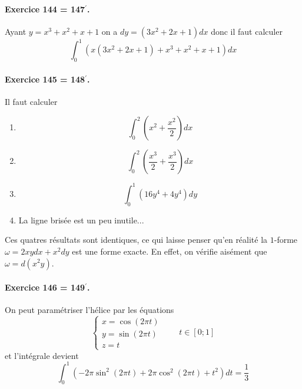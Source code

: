 \paragraph{Exercice 144 = 147$^\prime$.}
Ayant $y = x^3 + x^2 + x + 1$ on a $d y = (3 x^2 + 2 x + 1)d x$ donc
il faut calculer
\begin{equation*}
\int_0^1 (x (3 x^2 + 2 x + 1) + x^3 + x^2 + x + 1)d x
\end{equation*}

\paragraph{Exercice 145 = 148$^\prime$.}
Il faut calculer
\begin{enumerate}
\item
\begin{equation*}
\int_0^2 (x^2 + \frac{x^2}{2}) d x
\end{equation*}
\item
\begin{equation*}
\int_0^2 (\frac{x^3}{2} + \frac{x^3}{2}) d x
\end{equation*}
\item 
\begin{equation*}
\int_0^1  (16 y^4 + 4 y^4)d y
\end{equation*}
\item La ligne brisée est un peu inutile...
\end{enumerate}
Ces quatres résultats sont identiques, ce qui laisse penser qu'en
réalité la $1$-forme $\omega = 2 x y d x + x^2 d y$ est une forme
exacte. En effet, on vérifie aisément que $\omega = d (x^2 y)$.

\paragraph{Exercice 146 = 149$^\prime$.}
On peut paramétriser l'hélice par
les équations
\begin{equation*}
\begin{cases}
x = \cos(2 \pi t)\\
y = \sin(2 \pi t)\\
z = t
\end{cases}\qquad t \in [0;1]
\end{equation*}
et l'intégrale devient
\begin{equation*}
\int_0^1 \left(-2\pi \sin^2(2\pi t) + 2\pi \cos^2(2\pi t) +
t^2\right) d t = \frac13  
\end{equation*}

